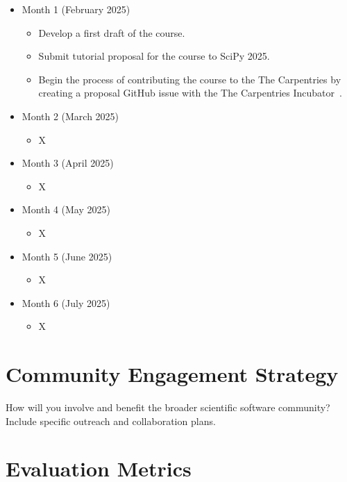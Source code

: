 \documentclass[letterpaper, 11pt]{article}
\begin{document}
\begin{itemize}
  \item Month 1 (February 2025)
    \begin{itemize}
      \item Develop a first draft of the course.
      \item Submit tutorial proposal for the course to SciPy 2025.
      \item Begin the process of contributing the course to the The Carpentries by creating a proposal GitHub issue with the The Carpentries Incubator~.
    \end{itemize}
  \item Month 2 (March 2025)
    \begin{itemize}
      \item X
    \end{itemize}
  \item Month 3 (April 2025)
    \begin{itemize}
      \item X
    \end{itemize}
  \item Month 4 (May 2025)
    \begin{itemize}
      \item X
    \end{itemize}
  \item Month 5 (June 2025)
    \begin{itemize}
      \item X
    \end{itemize}
  \item Month 6 (July 2025)
    \begin{itemize}
      \item X
    \end{itemize}
\end{itemize}

\section{Community Engagement Strategy}

How will you involve and benefit the broader scientific software community?
Include specific outreach and collaboration plans.

\section{Evaluation Metrics}
\end{document}
